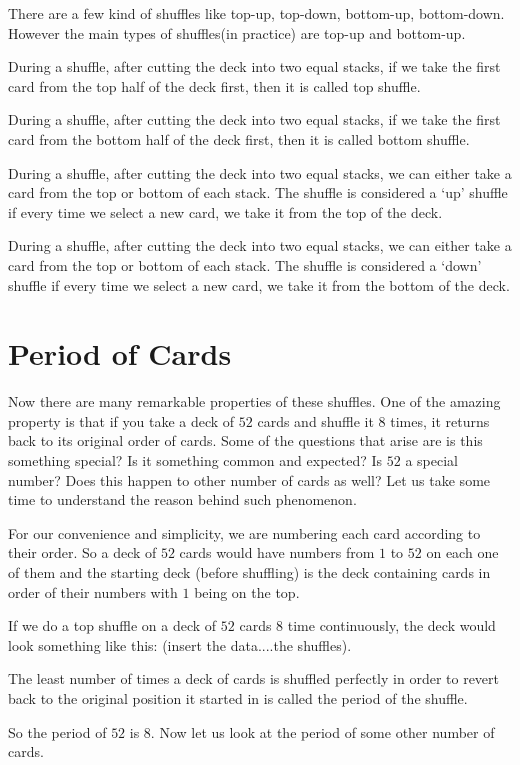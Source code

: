 \documentclass[10pt]{article}
\begin{document}
There are a few kind of shuffles like top-up, top-down, bottom-up, bottom-down.
However the main types of shuffles(in practice) are top-up and bottom-up.
\begin{defn}During a shuffle, after cutting the deck into two equal stacks, if we take the first card from the top half of the deck first, then it is called top shuffle.
\end{defn}
\begin{defn}During a shuffle, after cutting the deck into two equal stacks, if we take the first card from the bottom half of the deck first, then it is called bottom shuffle.
\end{defn}
 \begin{defn}[Up shuffle]During a shuffle, after cutting the deck into two equal stacks, we can either take a card from the top or bottom of each stack. The shuffle is considered a ‘up’ shuffle if every time we select a new card, we take it from the top of the deck. 
\end{defn}
\begin{defn}During a shuffle, after cutting the deck into two equal stacks, we can either take a card from the top or bottom of each stack. The shuffle is considered a ‘down’ shuffle if every time we select a new card, we take it from the bottom of the deck. 
\end{defn}
\section{Period of Cards}
Now there are many remarkable properties of these shuffles. One of the amazing property is that if you take a deck of $52$ cards and shuffle it $8$ times, it returns back to its original order of cards. Some of the questions that arise are is this something special? Is it something common and expected? Is $52$ a special number? Does this happen to other number of cards as well? Let us take some time to understand the reason behind such phenomenon.

For our convenience and simplicity, we are numbering each card according to their order. So a deck of $52$ cards would have numbers from $1$ to $52$ on each one of them and the starting deck (before shuffling) is the deck containing cards in order of their numbers with $1$ being on the top.

\vspace{4mm}If we do a top shuffle on a deck of $52$ cards $8$ time continuously, the deck would look something like this: (insert the data....the shuffles).
\begin{defn}[Period]The least number of times a deck of cards is shuffled perfectly in order to revert back to the original position it started in is called the period of the shuffle.
\end{defn}
So the period of $52$ is $8$.
Now let us look at the period of some other number of cards.
\end{document}
